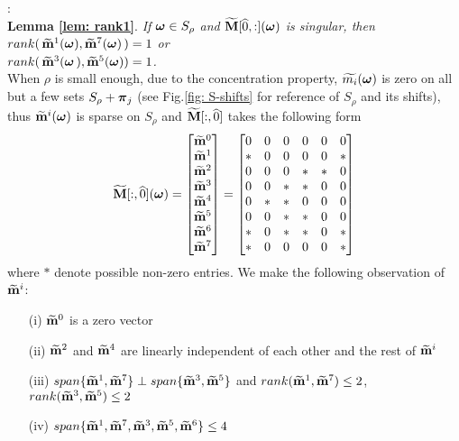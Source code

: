 :\\[.2em]
{\bf Lemma \ref{lem: rank1}}. {\it 
If $\boldsymbol{\omega}\in S_\rho$ and $\widetilde{\mathbf{M}}[\widehat{0},:](\boldsymbol{\omega})$ is singular, then $rank(\,\widetilde{\mathbf{m}}^{1}(\boldsymbol{\omega}),\widetilde{\mathbf{m}}^{7}(\boldsymbol{\omega})\,)=1$ or \\$rank(\,\widetilde{\mathbf{m}}^{3}(\boldsymbol{\omega}\,),\widetilde{\mathbf{m}}^{5}(\boldsymbol{\omega})) = 1$.
}\\[1em]
When $\rho$ is small enough, due to the concentration property, $\widetilde{m_{i}}(\boldsymbol{\omega})$ is zero on all but a few sets $S_\rho + \boldsymbol{\pi}_j$ (see Fig.\ref{fig: S-shifts} for reference of $S_\rho$ and its shifts), thus $\widetilde{\mathbf{m}}^{i}(\boldsymbol{\omega})$ is sparse on $S_\rho$ and $\widetilde{\mathbf{M}}[:,\widehat{0}]$ takes the following form
\begin{align}
\label{eq: sparse-mat}
\M[:,\widehat{0}](\V{\omega})=
\begin{bmatrix}
\mrow{0}\\
\mrow{1}\\
\mrow{2}\\
\mrow{3}\\
\mrow{4}\\
\mrow{5}\\
\mrow{6}\\
\mrow{7}
\end{bmatrix}
=
\begin{bmatrix}
0 & 0 & 0 & 0 & 0 & 0\\
* & 0 & 0 & 0 & 0 & *\\
0 & 0 & 0 & * & * & 0\\
0 & 0 & * & * & 0 & 0\\
0 & * & * & 0 & 0 & 0\\
0 & 0 & * & * & 0 & 0\\
* & 0 & * & * & 0 & *\\
* & 0 & 0 & 0 & 0 & *
\end{bmatrix}
\end{align}
where $*$ denote possible non-zero entries.
We make the following observation of $\widetilde{\mathbf{m}}^{i}$:
\begin{itemize}
\item[(i)] $\widetilde{\mathbf{m}}^{0}$ is a zero vector
\item[(ii)] $\widetilde{\mathbf{m}}^{2}$ and $\widetilde{\mathbf{m}}^{4}$ are linearly independent of each other and the rest of $\widetilde{\mathbf{m}}^{i}$
\item[(iii)] $span\{\widetilde{\mathbf{m}}^{1},\widetilde{\mathbf{m}}^{7}\} \perp span\{\widetilde{\mathbf{m}}^{3},\widetilde{\mathbf{m}}^{5}\}$ and $rank(\widetilde{\mathbf{m}}^{1},\widetilde{\mathbf{m}}^{7}) \leq 2$, \\$rank(\widetilde{\mathbf{m}}^{3},\widetilde{\mathbf{m}}^{5})\leq 2$
\item[(iv)] $span\{\widetilde{\mathbf{m}}^{1}, \widetilde{\mathbf{m}}^{7}, \widetilde{\mathbf{m}}^{3},\widetilde{\mathbf{m}}^{5},\widetilde{\mathbf{m}}^{6}\} \leq 4$
\end{itemize}
